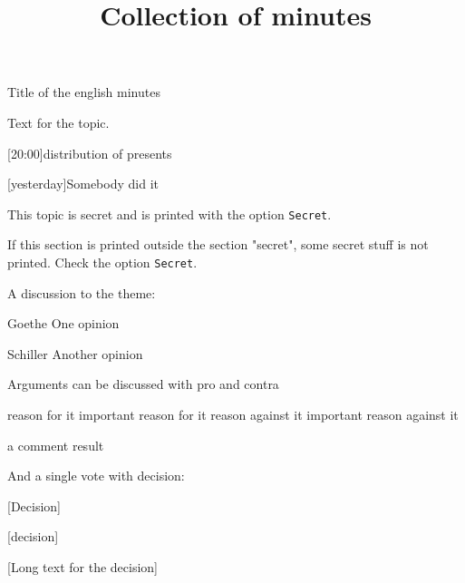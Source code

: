 \documentclass{article}
\title{Collection of minutes}
\author{\LaTeXe}
\begin{document}
\begin{Minutes}{Title of the english minutes}
\maketitle

Text for the topic.

[20:00]{distribution of presents}

[yesterday]{Somebody did it}

\newcols[][1]%
\begin{Secret}
This topic is secret and is printed with the option
\texttt{Secret}.
\end{Secret}
If this section is printed outside the section "secret", some
secret stuff is not printed. Check the option \texttt{Secret}.
\newcols




A discussion to the theme:
\begin{Opinions}
\item[Goethe] One opinion
\item[Schiller] Another opinion
\end{Opinions}

Arguments can be discussed with pro and contra
\begin{Argumentation}
\pro reason for it
\Pro important reason for it
\contra reason against it
\Contra important reason against it
\item a comment
\result result
\end{Argumentation}


And a single vote with decision:\par
{}[Decision]

\begin{Vote}
[decision]
\end{Vote}

[Long text for the decision]
\end{Minutes}
\end{document}
